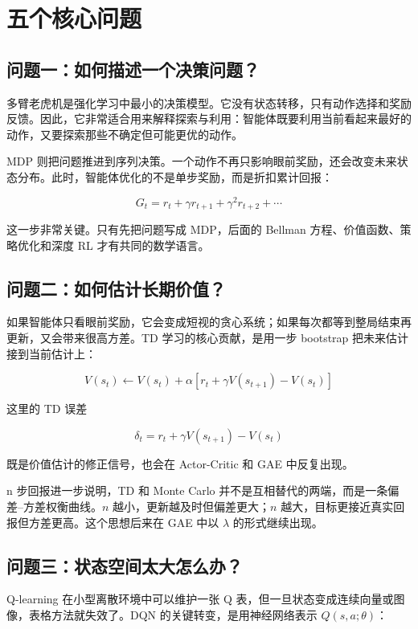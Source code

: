 \documentclass{article}
\begin{document}
\section*{五个核心问题}

\subsection*{问题一：如何描述一个决策问题？}

多臂老虎机是强化学习中最小的决策模型。它没有状态转移，只有动作选择和奖励反馈。因此，它非常适合用来解释探索与利用：智能体既要利用当前看起来最好的动作，又要探索那些不确定但可能更优的动作。

MDP 则把问题推进到序列决策。一个动作不再只影响眼前奖励，还会改变未来状态分布。此时，智能体优化的不是单步奖励，而是折扣累计回报：

\[
G_t = r_t + \gamma r_{t+1} + \gamma^2 r_{t+2} + \cdots
\]

这一步非常关键。只有先把问题写成 MDP，后面的 Bellman 方程、价值函数、策略优化和深度 RL 才有共同的数学语言。

\subsection*{问题二：如何估计长期价值？}

如果智能体只看眼前奖励，它会变成短视的贪心系统；如果每次都等到整局结束再更新，又会带来很高方差。TD 学习的核心贡献，是用一步 bootstrap 把未来估计接到当前估计上：

\[
V(s_t) \leftarrow V(s_t) + \alpha\left[r_t + \gamma V(s_{t+1}) - V(s_t)\right]
\]

这里的 TD 误差

\[
\delta_t = r_t + \gamma V(s_{t+1}) - V(s_t)
\]

既是价值估计的修正信号，也会在 Actor-Critic 和 GAE 中反复出现。

n 步回报进一步说明，TD 和 Monte Carlo 并不是互相替代的两端，而是一条偏差--方差权衡曲线。$n$ 越小，更新越及时但偏差更大；$n$ 越大，目标更接近真实回报但方差更高。这个思想后来在 GAE 中以 $\lambda$ 的形式继续出现。

\subsection*{问题三：状态空间太大怎么办？}

Q-learning 在小型离散环境中可以维护一张 Q 表，但一旦状态变成连续向量或图像，表格方法就失效了。DQN 的关键转变，是用神经网络表示 $Q(s,a;\theta)$：
\end{document}
